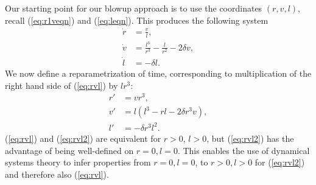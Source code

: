 \documentclass[reqno,12pt]{amsart}
\newcommand{\eqlab}[1]{\label{eq:#1}}
\renewcommand{\eqref}[1]{(\ref{eq:#1})}
\numberwithin{equation}{section}
\begin{document}
Our starting point for our blowup approach is to use the coordinates $(r,v,l)$, recall \eqref{r1veqn} and \eqref{leqn}. This produces the following system
\begin{equation}\eqlab{rvl}
\begin{aligned}
 \dot r &= \frac{v}{l},\\
 \dot v &=\frac{l^3}{r^3}-\frac{l}{r^2}-2\delta v,\\
 \dot l &=-\delta l. 
\end{aligned}
\end{equation}
We now define a reparametrization of time, corresponding to multiplication of the right hand side of \eqref{rvl} by $l r^3$:
\begin{equation}\eqlab{rvl2}
\begin{aligned}
 r' &= vr^3,\\
 v' &=l\left(l^3-rl-2\delta r^3 v\right),\\
 l' &=-\delta r^3 l^2.
\end{aligned}
\end{equation}
\eqref{rvl} and \eqref{rvl2} are equivalent for $r>0$, $l>0$, but \eqref{rvl2} has the advantage of being well-defined on $r=0,l=0$. This enables the use of dynamical systems theory to infer properties from $r=0,l=0$, to $r>0,l>0$ for \eqref{rvl2} and therefore also \eqref{rvl}. 
\end{document}
